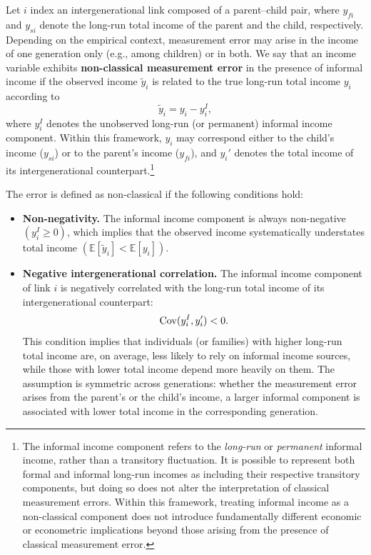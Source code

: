 \begin{assumption}\leavevmode
Let $i$ index an intergenerational link composed of a parent–child pair, where $y_{fi}$ and $y_{si}$ denote the long-run total income of the parent and the child, respectively.  
Depending on the empirical context, measurement error may arise in the income of one generation only (e.g., among children) or in both.  
We say that an income variable exhibits \textbf{non-classical measurement error} in the presence of informal income if the observed income $\tilde{y}_i$ is related to the true long-run total income $y_i$ according to
\[
\tilde{y}_i = y_i - y_i^I,
\]
where $y_i^I$ denotes the unobserved long-run (or permanent) informal income component.  
Within this framework, $y_i$ may correspond either to the child’s income ($y_{si}$) or to the parent’s income ($y_{fi}$), and $y_i'$ denotes the total income of its intergenerational counterpart.\footnote{
The informal income component refers to the \textit{long-run} or \textit{permanent} informal income, rather than a transitory fluctuation.  
It is possible to represent both formal and informal long-run incomes as including their respective transitory components, but doing so does not alter the interpretation of classical measurement errors.  
Within this framework, treating informal income as a non-classical component does not introduce fundamentally different economic or econometric implications beyond those arising from the presence of classical measurement error.}

The error is defined as non-classical if the following conditions hold:
\begin{itemize}[nosep]
   \item[B1] \textbf{Non-negativity.}  
   The informal income component is always non-negative $(y_i^I \ge 0)$, which implies that the observed income systematically understates total income $(\mathbb{E}[\tilde{y}_i] < \mathbb{E}[y_i])$.  
   
   \item[B2] \textbf{Negative intergenerational correlation.}  
   The informal income component of link $i$ is negatively correlated with the long-run total income of its intergenerational counterpart:
   \[
   \operatorname{Cov}(y_i^I, y_i') < 0.
   \]
   This condition implies that individuals (or families) with higher long-run total income are, on average, less likely to rely on informal income sources, while those with lower total income depend more heavily on them.  
   The assumption is symmetric across generations: whether the measurement error arises from the parent’s or the child’s income, a larger informal component is associated with lower total income in the corresponding generation.
\end{itemize}
\end{assumption}



